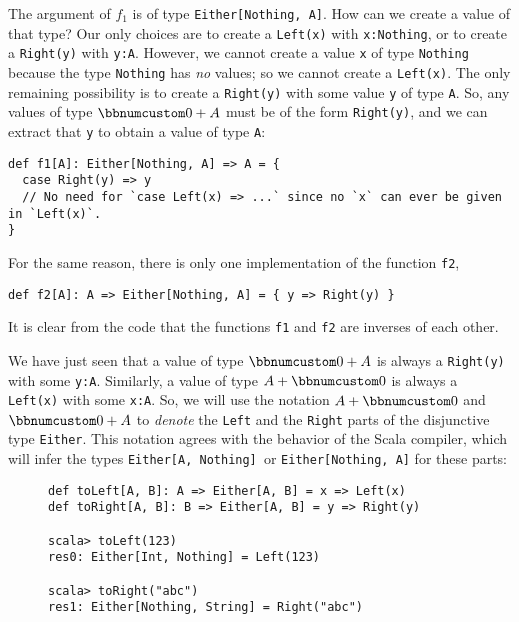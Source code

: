 The argument of $f_{1}$ is of type \lstinline!Either[Nothing, A]!.
How can we create a value of that type? Our only choices are to create
a \lstinline!Left(x)! with \lstinline!x:Nothing!, or to create a
\lstinline!Right(y)! with \lstinline!y:A!. However, we cannot create
a value \lstinline!x! of type \lstinline!Nothing! because the type
\lstinline!Nothing! has \emph{no} values; so we cannot create a \lstinline!Left(x)!.
The only remaining possibility is to create a \lstinline!Right(y)!
with some value \lstinline!y! of type \lstinline!A!. So, any values
of type $\bbnum 0+A$ must be of the form \lstinline!Right(y)!, and
we can extract that \lstinline!y! to obtain a value of type \lstinline!A!:
\begin{lstlisting}
def f1[A]: Either[Nothing, A] => A = {
  case Right(y) => y
  // No need for `case Left(x) => ...` since no `x` can ever be given in `Left(x)`.
}
\end{lstlisting}
For the same reason, there is only one implementation of the function
\lstinline!f2!,
\begin{lstlisting}
def f2[A]: A => Either[Nothing, A] = { y => Right(y) }
\end{lstlisting}
It is clear from the code that the functions \lstinline!f1! and \lstinline!f2!
are inverses of each other.

We have just seen that a value of type $\bbnum 0+A$ is always a \lstinline!Right(y)!
with some \lstinline!y:A!. Similarly, a value of type $A+\bbnum 0$
is always a \lstinline!Left(x)! with some \lstinline!x:A!. So, we
will use the notation $A+\bbnum 0$ and $\bbnum 0+A$ to \emph{denote}
the \lstinline!Left! and the \lstinline!Right! parts of the disjunctive
type \lstinline!Either!. This notation agrees with the behavior of
the Scala compiler, which will infer the types \lstinline!Either[A, Nothing] !or
\lstinline!Either[Nothing, A]! for these parts:

\begin{wrapfigure}{l}{0.53\columnwidth}%
\vspace{-0.5\baselineskip}
\begin{lstlisting}
def toLeft[A, B]: A => Either[A, B] = x => Left(x)
def toRight[A, B]: B => Either[A, B] = y => Right(y)

scala> toLeft(123)
res0: Either[Int, Nothing] = Left(123)

scala> toRight("abc")
res1: Either[Nothing, String] = Right("abc")
\end{lstlisting}

\vspace{-2\baselineskip}
\end{wrapfigure}%

